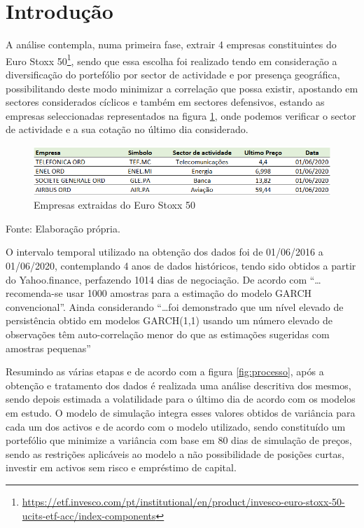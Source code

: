 \documentclass[
  12pt,
  a4paper,
  openany]{book}
\theoremstyle{definition}
\theoremstyle{definition}
\theoremstyle{definition}
\theoremstyle{remark}
\begin{document}
\newpage

\hypertarget{introduuxe7uxe3o-2}{%
\section{Introdução}\label{introduuxe7uxe3o-2}}

A análise contempla, numa primeira fase, extrair 4 empresas constituintes do Euro Stoxx 50\footnote{\url{https://etf.invesco.com/pt/institutional/en/product/invesco-euro-stoxx-50-ucits-etf-acc/index-components}}, sendo que essa escolha foi realizado tendo em consideração a diversificação do portefólio por sector de actividade e por presença geográfica, possibilitando deste modo minimizar a correlação que possa existir, apostando em sectores considerados cíclicos e também em sectores defensivos, estando as empresas seleccionadas representados na figura \ref{fig:empresas}, onde podemos verificar o sector de actividade e a sua cotação no último dia considerado.

\begin{figure}

{\centering \includegraphics[width=1\linewidth]{image/cotacao} 

}

\caption{Empresas extraidas do Euro Stoxx 50}\label{fig:empresas}
\end{figure}
\FloatBarrier
\centering

Fonte: Elaboração própria.

\justifying
\bigskip

O intervalo temporal utilizado na obtenção dos dados foi de 01/06/2016 a 01/06/2020, contemplando 4
anos de dados históricos, tendo sido obtidos a partir do Yahoo.finance, perfazendo 1014 dias de negociação. De acordo com \citet{NG2006} ``\ldots recomenda-se usar 1000 amostras para a estimação do modelo GARCH convencional''. Ainda considerando \citet{smallsample} ``\ldots foi demonstrado que um nível elevado de persistência obtido em modelos GARCH(1,1) usando um número elevado de observações têm auto-correlação menor do que as estimações sugeridas com amostras pequenas''

Resumindo as várias etapas e de acordo com a figura \ref{fig:processo}, após a obtenção e tratamento dos dados é realizada uma análise descritiva dos mesmos, sendo depois estimada a volatilidade para o último dia de acordo com os modelos em estudo. O modelo de simulação integra esses valores obtidos de variância para cada um dos activos e de acordo com o modelo utilizado, sendo constituído um portefólio que minimize a variância com base em 80 dias de simulação de preços, sendo as restrições aplicáveis ao modelo a não possibilidade de posições curtas, investir em activos sem risco e empréstimo de capital.
\end{document}
